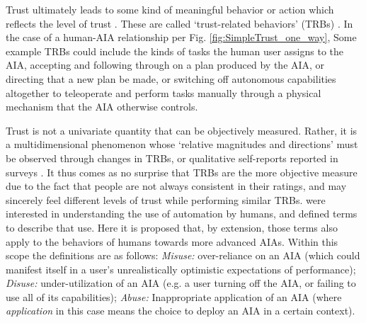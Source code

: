 
Trust ultimately leads to some kind of meaningful behavior or action which reflects the level of trust \cite{Lewis1985-pr}. 
These are called `trust-related behaviors' (TRBs) \cite{McKnight2001-fa}. %
In the case of a human-AIA relationship per Fig. \ref{fig:SimpleTrust_one_way}, %
Some example TRBs could include the kinds of tasks the human user assigns to the AIA, accepting and following through on a plan produced by the AIA, or directing that a new plan be made, or switching off autonomous capabilities altogether to teleoperate and perform tasks manually through a physical mechanism that the AIA otherwise controls.  %

    
    Trust is not a univariate quantity that can be objectively measured. Rather, it is a multidimensional phenomenon whose `relative magnitudes and directions' must be observed through changes in TRBs, or qualitative self-reports reported in surveys \cite{Muir1996-gt}. It thus comes as no surprise that TRBs are the more objective measure due to the fact that people are not always consistent in their ratings, and may sincerely feel different levels of trust while performing similar TRBs. \citet{Parasuraman1997-co} were interested in understanding the use of automation by humans, and defined terms to describe that use. Here it is proposed that, by extension, those terms also apply to the behaviors of humans towards more advanced AIAs. Within this scope the definitions are as follows: \textit{Misuse:} over-reliance on an AIA (which could manifest itself in a user's unrealistically optimistic expectations of performance); \textit{Disuse:} under-utilization of an AIA (e.g. a user turning off the AIA, or failing to use all of its capabilities); \textit{Abuse:} Inappropriate application of an AIA (where \emph{application} in this case means the choice to deploy an AIA in a certain context).

